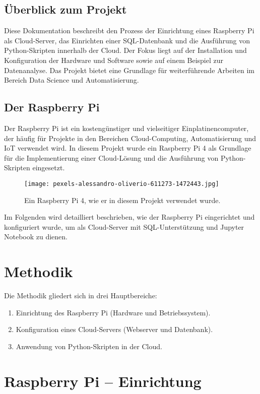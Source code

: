 \documentclass[a4paper,12pt]{article}
\begin{document}
\subsection{Überblick zum Projekt}
Diese Dokumentation beschreibt den Prozess der Einrichtung eines Raspberry Pi als Cloud-Server, das Einrichten einer SQL-Datenbank und die Ausführung von Python-Skripten innerhalb der Cloud. Der Fokus liegt auf der Installation und Konfiguration der Hardware und Software sowie auf einem Beispiel zur Datenanalyse. Das Projekt bietet eine Grundlage für weiterführende Arbeiten im Bereich Data Science und Automatisierung.

\subsection{Der Raspberry Pi}
Der Raspberry Pi ist ein kostengünstiger und vielseitiger Einplatinencomputer, der häufig für Projekte in den Bereichen Cloud-Computing, Automatisierung und IoT verwendet wird. In diesem Projekt wurde ein Raspberry Pi 4 als Grundlage für die Implementierung einer Cloud-Lösung und die Ausführung von Python-Skripten eingesetzt.

\begin{figure}[h!]
    \raggedright %
    \texttt{[image: pexels-alessandro-oliverio-611273-1472443.jpg]}
    \caption{Ein Raspberry Pi 4, wie er in diesem Projekt verwendet wurde.}
    \label{fig:raspberry_pi}
\end{figure}

Im Folgenden wird detailliert beschrieben, wie der Raspberry Pi eingerichtet und konfiguriert wurde, um als Cloud-Server mit SQL-Unterstützung und Jupyter Notebook zu dienen.


\section{Methodik}
Die Methodik gliedert sich in drei Hauptbereiche:
\begin{enumerate}
    \item Einrichtung des Raspberry Pi (Hardware und Betriebssystem).
    \item Konfiguration eines Cloud-Servers (Webserver und Datenbank).
    \item Anwendung von Python-Skripten in der Cloud.
\end{enumerate}

\section{Raspberry Pi – Einrichtung}
\end{document}

